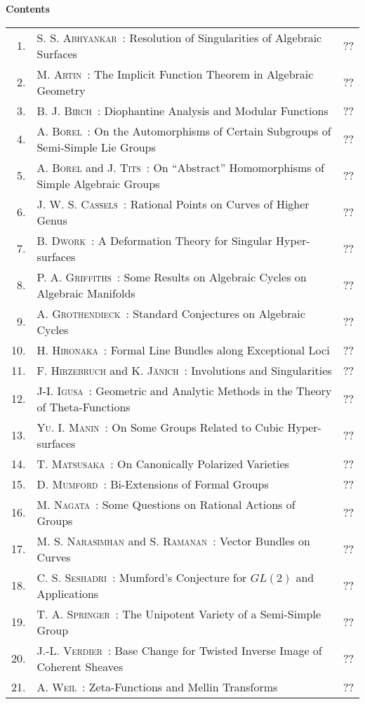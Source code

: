 
\thispagestyle{empty}

\noindent
{\bf\huge Contents}

\vskip 1cm

\thispagestyle{empty}

\noindent
\renewcommand{\arraystretch}{1.7}
\begin{longtable}[l]{r>{\raggedright}p{9cm}r}
1. & \textsc{S. S. Abhyankar~:} Resolution of Singularities of Algebraic Surfaces & ?? \\
2. & \textsc{M. Artin~:} The Implicit Function Theorem in Algebraic Geometry & ?? \\
3. & \textsc{B. J. Birch~:} Diophantine Analysis and Modular Functions & ?? \\
4. & \textsc{A. Borel~:} On the Automorphisms of Certain Subgroups of Semi-Simple Lie Groups & ?? \\
5. & \textsc{A. Borel} and \textsc{J. Tits~:} On ``Abstract'' Homomorphisms of Simple Algebraic Groups  & ?? \\
6. & \textsc{J. W. S. Cassels~:} Rational Points on Curves of Higher Genus & ?? \\
7. & \textsc{B. Dwork~:} A Deformation Theory for Singular Hyper-surfaces & ?? \\
8. & \textsc{P. A. Griffiths~:} Some Results on Algebraic Cycles on Algebraic Manifolds & ?? \\
9. & \textsc{A. Grothendieck~:} Standard Conjectures on Algebraic Cycles & ?? \\
10. & \textsc{H. Hironaka~:} Formal Line Bundles along Exceptional Loci & ?? \\
11. & \textsc{F. Hirzebruch} and \textsc{K. J\"anich~:} Involutions and Singularities  & ?? \\
12. & \textsc{J-I. Igusa~:} Geometric and Analytic Methods in the Theory of Theta-Functions & ?? \\
13. & \textsc{Yu. I. Manin~:} On Some Groups Related to Cubic Hyper-surfaces & ?? \\
14. & \textsc{T. Matsusaka~:} On Canonically Polarized Varieties & ?? \\
15. & \textsc{D. Mumford~:} Bi-Extensions of Formal Groups & ?? \\
16. & \textsc{M. Nagata~:} Some Questions on Rational Actions of Groups & ?? \\
17. & \textsc{M. S. Narasimhan} and \textsc{S. Ramanan~:} Vector Bundles on Curves & ?? \\
18. & \textsc{C. S. Seshadri~:} Mumford's Conjecture for $GL(2)$ and Applications & ?? \\
19. & \textsc{T. A. Springer~:} The Unipotent Variety of a Semi-Simple Group  & ?? \\
20. & \textsc{J.-L. Verdier~:} Base Change for Twisted Inverse Image of Coherent Sheaves & ?? \\
21. & \textsc{A. Weil~:} Zeta-Functions and Mellin Transforms & ?? \\
\end{longtable}

\thispagestyle{empty}
